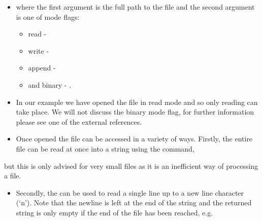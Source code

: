 \documentclass[letterpaper,10pt,english,openany]{sphinxmanual}
\begin{document}
\begin{sphinxVerbatim}[commandchars=\\\{\}]
   
\end{sphinxVerbatim}
\begin{itemize}
\item {} 
where the first argument is the full path to the file and the second
argument is one of mode flags:
\begin{itemize}
\item {} 
read - 

\item {} 
write - 

\item {} 
append - 

\item {} 
and binary - .

\end{itemize}

\item {} 
In our example we have opened the file in read mode and so only
reading can take place. We will not discuss the binary mode flag, for
further information please see one of the external references.

\item {} 
Once opened the file can be accessed in a variety of ways. Firstly,
the entire file can be read at once into a string using the
 command,

\end{itemize}

\begin{sphinxVerbatim}[commandchars=\\\{\}]
  
\end{sphinxVerbatim}

but this is only advised for very small files as it is an inefficient
way of processing a file.
\begin{itemize}
\item {} 
Secondly, the  can be used to read a single line up to
a new line character (‘n’). Note that the newline is left at the end
of the string and the returned string is only empty if the end of the
file has been reached, e.g.

\end{itemize}
\end{document}
